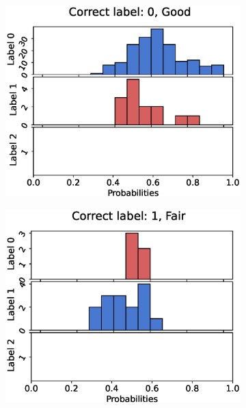\begin{figure}
  \centering
  \begin{subfigure}[t]{0.33\textwidth}
    \includegraphics[width=\textwidth]{files/figs/res/kmfp/pc0-rb.eps}
    \caption{}
    \label{fig:kmfp-pc0}
  \end{subfigure}%
  \begin{subfigure}[t]{0.33\textwidth}
    \includegraphics[width=\textwidth]{files/figs/res/kmfp/pc1-rb.eps}
    \caption{}
    \label{fig:kmfp-pc1}
  \end{subfigure}%
  \begin{subfigure}[t]{0.33\textwidth}

\end{subfigure}
\end{figure}
